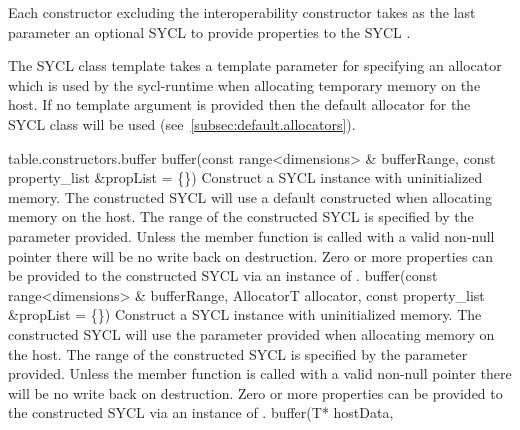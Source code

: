 Each constructor excluding the interoperability constructor takes as the last parameter an optional SYCL  to provide properties to the SYCL .

The SYCL  class template takes a template parameter  for specifying an allocator which is used by the \gls{sycl-runtime} when allocating temporary memory on the host. If no template argument is provided then the default allocator for the SYCL  class  will be used (see~\ref{subsec:default.allocators}).




{table.constructors.buffer}
  \addRowTwoSL
    {  buffer(const range<dimensions> \& bufferRange, }
    {  const property_list \&propList = \{\}) }
    {
       Construct a SYCL  instance with uninitialized memory.      
       The constructed SYCL  will use a default constructed  when allocating memory on the host.
        The range of the constructed SYCL  is specified by the  parameter provided.
       Unless the member function  is called with a valid non-null pointer there will be no write back on destruction.
       Zero or more properties can be provided to the constructed SYCL  via an instance of .
    }
  \addRowThreeSL
    {  buffer(const range<dimensions> \& bufferRange, }
    {  AllocatorT allocator, }
    {  const property_list \&propList = \{\}) }
    {
       Construct a SYCL  instance with uninitialized memory.      
       The constructed SYCL  will use the  parameter provided when allocating memory on the host.
       The range of the constructed SYCL  is specified by the  parameter provided.
       Unless the member function  is called with a valid non-null pointer there will be no write back on destruction.
       Zero or more properties can be provided to the constructed SYCL  via an instance of .
     }
  \addRowThreeSL
   { buffer(T* hostData,}
